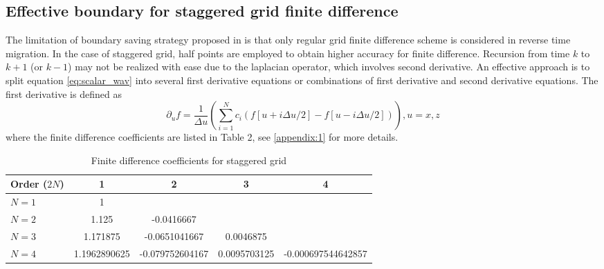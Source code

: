 

\subsection{Effective boundary for staggered grid finite difference}

The limitation of boundary saving strategy proposed in \cite{dussaud2008computational} is that only regular grid finite difference scheme is considered in reverse time migration. In the case of staggered grid, half points are employed to obtain higher accuracy for finite difference. Recursion from time $k$ to $k+1$ (or $k-1$) may not be realized with ease due to the laplacian operator, which involves second derivative. An effective approach is to split equation \eqref{eq:scalar_wav} into several first derivative equations or combinations of first derivative and second derivative equations. The first derivative is defined as
\begin{equation}
\partial_u f=\frac{1}{\Delta u}\left(
\sum_{i=1}^{N} c_i(f[u+i\Delta u/2]-f[u-i\Delta u/2])\right), u=x,z
\end{equation}
where the finite difference coefficients are listed in Table 2, see \ref{appendix:1} for more details.


\begin{table*}
  \centering
  \caption{Finite difference coefficients for staggered grid}\label{table:2}
  \begin{tabular}{l|c|c|c|c}
     \hline
     Order ($2N$) & 1 		& 2 		& 3 		& 4\\
     \hline
     $N=1$	&1 		&  		&  		&   	\\
     $N=2$ 	&1.125		&-0.0416667	&		&   	\\
     $N=3$	&1.171875	&-0.0651041667	&0.0046875	&	\\
     $N=4$	&1.1962890625	&-0.079752604167&0.0095703125	&-0.000697544642857\\
     \hline
   \end{tabular}
\end{table*}

